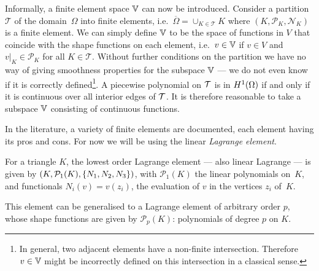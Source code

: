 \documentclass[thesis.tex]{subfiles}
\begin{document}
  Informally, a finite element space $\mathbb{V}$ can now be introduced. Consider a partition $\mathcal{T}$ of the domain~$\Omega$ into finite elements,
  i.e.~$\overline{\Omega} = \cup_{K \in \mathcal{T}} K$ where $(K, \mathcal{P}_K, \mathcal{N}_K)$ is a finite element.
  We can simply define $\mathbb{V}$ to be the space of functions in $V$ that coincide with the shape functions on each element,
  i.e.~$v \in \mathbb{V}$ if $v \in V$ and $v|_{K} \in \mathcal{P}_K$ for all $K \in \mathcal{T}$. 
  Without further conditions on the partition we have no way of giving smoothness  properties for the subspace $\mathbb{V}$ --- we do not even know if it is correctly defined\footnote{In general, two adjacent elements have a non-finite intersection. 
  Therefore $v \in \mathbb{V}$ might be incorrectly defined on this intersection in a classical sense.}.
  A piecewise polynomial on $\mathcal{T}$ is in $H^1(\Omega)$ if and only if it is continuous over all interior edges of $\mathcal{T}$.
  It is therefore reasonable to take a subspace $\mathbb{V}$ consisting
  of continuous functions.

  In the literature, a variety of finite elements are documented, 
  each element having its pros and cons. For now we will be using  the linear \emph{Lagrange element}.
  \begin{exmp}
  For a triangle $K$, the lowest order Lagrange element  --- also linear Lagrange --- is given by 
  $(K, \mathcal{P}_1(K), \set{N_1, N_2, N_3})$, with $\mathcal{P}_1(K)$ the linear polynomials on~$K$, and functionals $N_i(v) = v(z_i)$,
  the evaluation of $v$ in the vertices $z_i$ of~$K$.
  \end{exmp}
  This element can be generalised to a Lagrange element of arbitrary order $p$,
  whose shape functions are given by $\mathcal{P}_p(K)$: polynomials of degree $p$ on $K$.
\end{document}
